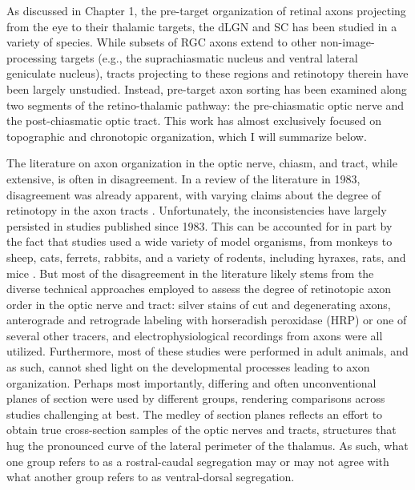 \label{sec:RetinogeniculateOrganization}
As discussed in Chapter 1, the pre-target organization of retinal axons projecting from the eye to their thalamic targets, the dLGN and SC has been studied in a variety of species.
While subsets of RGC axons extend to other non-image-processing targets (e.g., the suprachiasmatic nucleus and ventral lateral geniculate nucleus), tracts projecting to these regions and retinotopy therein have been largely unstudied.
Instead, pre-target axon sorting has been examined along two segments of the retino-thalamic pathway: the pre-chiasmatic optic nerve and the post-chiasmatic optic tract.
This work has almost exclusively focused on topographic and chronotopic organization, which I will summarize below.

The literature on axon organization in the optic nerve, chiasm, and tract, while extensive, is often in disagreement.
In a review of the literature in 1983, disagreement was already apparent, with varying claims about the degree of retinotopy in the axon tracts \cite{martin1983role}.
Unfortunately, the inconsistencies have largely persisted in studies published since 1983.
This can be accounted for in part by the fact that studies used a wide variety of model organisms, from monkeys to sheep, cats, ferrets, rabbits, and a variety of rodents, including hyraxes, rats, and mice \cite{martin1983role}. 
But most of the disagreement in the literature likely stems from the diverse technical approaches employed to assess the degree of retinotopic axon order in the optic nerve and tract: silver stains of cut and degenerating axons, anterograde and retrograde labeling with horseradish peroxidase (HRP) or one of several other tracers, and electrophysiological recordings from axons were all utilized.
Furthermore, most of these studies were performed in adult animals, and as such, cannot shed light on the developmental processes leading to axon organization.
Perhaps most importantly, differing and often unconventional planes of section were used by different groups, rendering comparisons across studies challenging at best.
The medley of section planes reflects an effort to obtain true cross-section samples of the optic nerves and tracts, structures that hug the pronounced curve of the lateral perimeter of the thalamus.
As such, what one group refers to as a rostral-caudal segregation may or may not agree with what another group refers to as ventral-dorsal segregation. %

